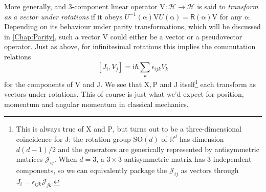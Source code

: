 \documentclass{article}
\theoremstyle{plain}\theoremheaderfont{\normalfont\itshape}\theorembodyfont{\rmfamily}\theoremseparator{.}\newtheorem*{rem}{Remark}\newtheorem*{ex}{Example}\newtheorem*{proof}{Proof}\newtheorem*{altp}{Alternative proof}
\theoremstyle{plain}\theoremheaderfont{\normalfont\bfseries}\theorembodyfont{\rmfamily}\theoremseparator{.}\newtheorem{thm}{Theorem}[section]\newtheorem{lem}[thm]{Lemma}\newtheorem{prop}[thm]{Proposition}\newtheorem*{cor}{Corollary}\newtheorem{defn}[thm]{Definition}\newtheorem{clm}[thm]{Claim}\newtheorem{clminproof}{Claim}
\theoremstyle{break}\theoremheaderfont{\normalfont\itshape}\theorembodyfont{\rmfamily}\theoremseparator{.\medskip}\newtheorem*{proofskip}{Proof}\newtheorem*{exs}{Examples}\newtheorem*{rems}{Remarks}
\theoremstyle{break}\theoremheaderfont{\normalfont\bfseries}\theorembodyfont{\rmfamily}\theoremseparator{.\medskip}\newtheorem{lemskip}[thm]{Lemma}\newtheorem{defnskip}[thm]{Definition}\newtheorem{propskip}[thm]{Proposition}\newtheorem{thmskip}[thm]{Theorem}
\numberwithin{equation}{section}
\newcommand{\ii}{\mathrm{i}}
\newcommand{\vb}[1]{\bm{\mathrm{#1}}}
\newcommand{\hb}{\mathcal{H}}
\newcommand{\RR}{\mathbb{R}}
\newcommand{\SO}{\mathrm{SO}}
\begin{document}
    More generally, and 3-component linear operator \(\vb{V}:\hb\to\hb\) is said to \textit{transform as a vector under rotations} if it obeys \(U^{-1}(\vb{\alpha})\vb{V}U(\vb{\alpha})=\mathsf{R}(\vb{\alpha})\vb{V}\) for any \(\vb{\alpha}\). Depending on its behaviour under parity transformations, which will be discussed in \cref{Chap:Parity}, such a vector \(\vb{V}\) could either be a vector or a pseudovector operator. Just as above, for infinitesimal rotations this implies the commutation relations
    \begin{equation}\label{angular_momentum_vector_commutator}
        [J_i,V_j]=\ii\hbar\sum_k\epsilon_{ijk}V_k
    \end{equation}
    for the components of \(\vb{V}\) and \(\vb{J}\). We see that \(\vb{X},\vb{P}\) and \(\vb{J}\) itself\footnote{This is always true of \(\vb{X}\) and \(\vb{P}\), but turns out to be a three-dimensional coincidence for \(\vb{J}\): the rotation group \(\SO(d)\) of \(\RR^d\) has dimension \(d(d-1)/2\) and the generators are generically represented by antisymmetric matrices \(\mathcal{J}_{ij}\). When \(d=3\), a \(3\times 3\) antisymmetric matrix has \(3\) independent components, so we can equivalently package the \(\mathcal{J}_{ij}\) as vectors through \(J_i=\epsilon_{ijk}\mathcal{J}_{jk}\).} each transform as vectors under rotations. This of course is just what we'd expect for position, momentum and angular momentum in classical mechanics.
\end{document}
